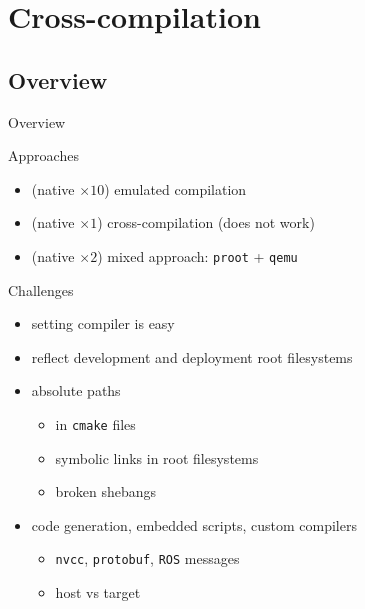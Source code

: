\documentclass[hyperref={colorlinks=false, breaklinks=true},11pt]{beamer}
\begin{document}
\section{Cross-compilation}

\subsection{Overview}
\begin{frame}{Overview}
    \begin{block}{Approaches}
        \begin{itemize}
            \item (native $\times 10$) emulated compilation
            \item (native $\times 1$) cross-compilation (does not work)
            \item (native $\times 2$) mixed approach: \texttt{proot} + \texttt{qemu}
        \end{itemize}
    \end{block}

    \begin{block}{Challenges}
        \begin{itemize}
            \item setting compiler is easy
            \item reflect development and deployment root filesystems
            \item absolute paths
                \begin{itemize}
                    \item in \texttt{cmake} files
                    \item symbolic links in root filesystems
                    \item broken shebangs
                \end{itemize}
            \item code generation, embedded scripts, custom compilers
                \begin{itemize}
                    \item \texttt{nvcc}, \texttt{protobuf}, \texttt{ROS} messages
                    \item host vs target
                \end{itemize}
        \end{itemize}
    \end{block}
\end{frame}
\end{document}
